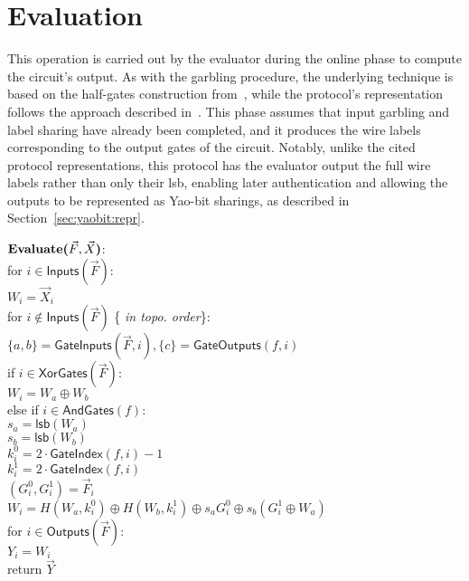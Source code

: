 \section{Evaluation}

This operation is carried out by the evaluator during the online phase to compute the circuit’s output. As with the garbling procedure, the underlying technique is based on the half-gates construction from~\cite{EC:ZahRosEva15}, while the protocol’s representation follows the approach described in~\cite{EPRINT:GYWYL23}. This phase assumes that input garbling and label sharing have already been completed, and it produces the wire labels corresponding to the output gates of the circuit. Notably, unlike the cited protocol representations, this protocol has the evaluator output the full wire labels rather than only their \textsf{lsb}, enabling later authentication and allowing the outputs to be represented as Yao-bit sharings, as described in Section~\ref{sec:yaobit:repr}.

\begin{protocol}[Evaluate]	
	$\textbf{Evaluate(}\vec{F}, \vec{X}\textbf{)}$:\\
	\indent  for $i \in \textsf{Inputs}(\vec{F})$: \\
	\indent \indent  $W_i = \vec{X}_i$ \\
	\indent  for $i \notin \textsf{Inputs}(\vec{F})$ \{\textit{ in topo. order}\}: \\
	\indent \indent  $\{a, b\} = \textsf{GateInputs}(\vec{F}, i), \{c\} = \textsf{GateOutputs}(f, i)$ \\
	\indent \indent  if $i \in \textsf{XorGates}(\vec{F})$: \\
	\indent \indent \indent  $W_i = W_a \oplus W_b$ \\
	\indent \indent  else if $i \in \textsf{AndGates}(f)$:\\
	\indent \indent \indent  $s_a = \textsf{lsb}(W_a)$ \\
	\indent \indent \indent  $s_b = \textsf{lsb}(W_b)$ \\
	\indent \indent \indent $k_i^0 = 2 \cdot \textsf{GateIndex}(f, i) - 1$\\
	\indent \indent \indent $k_i^1 = 2 \cdot \textsf{GateIndex}(f, i)$ \\
	\indent \indent \indent  $(G_i^0, G_i^1) = \vec{F}_i$ \\
	\indent \indent \indent  $W_i = H(W_a, k_i^0) \oplus H(W_b, k_i^1) \oplus s_a G_i^0 \oplus s_b (G_i^1 \oplus W_a)$ \\
	\indent  for $i \in \textsf{Outputs}(\vec{F})$:\\
	\indent \indent  $Y_i = W_i$ \\
	\indent  return $\vec{Y}$
\end{protocol}